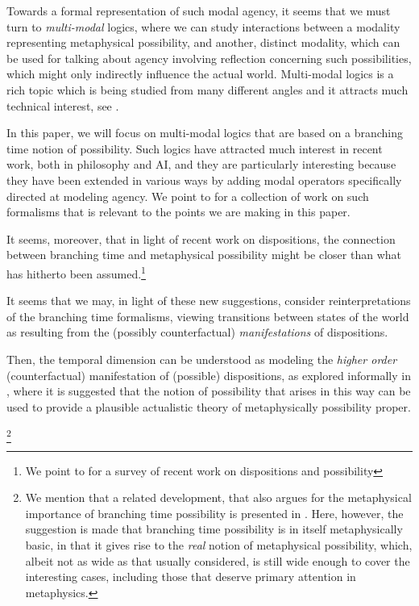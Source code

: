 \documentclass{article}
\begin{document}
Towards a formal representation of such modal agency, it seems that we must turn to \emph{multi-modal} logics, where we can study interactions between a modality representing metaphysical possibility, and another, distinct modality, which can be used for talking about agency involving reflection concerning such possibilities, which might only indirectly influence the actual world. Multi-modal logics is a rich topic which is being studied from many different angles and it attracts much technical interest, see \cite{multimod}.

In this paper, we will focus on multi-modal logics that are based on a branching time notion of possibility. Such logics have attracted much interest in recent work, both in philosophy and AI, and they are particularly interesting because they have been extended in various ways by adding modal operators specifically directed at modeling agency. We point to \cite{stit,dstit,atl,atle,nctl,stitstart} for a collection of work on such formalisms that is relevant to the points we are making in this paper.

It seems, moreover, that in light of recent work on dispositions, the connection between branching time and metaphysical possibility might be closer than what has hitherto been assumed.\footnote{We point to \cite{MwPw} for a survey of recent work on dispositions and possibility} 

It seems that we may, in light of these new suggestions, consider reinterpretations of the branching time formalisms, viewing transitions between states of the world as resulting from the (possibly counterfactual) \emph{manifestations} of dispositions. 

Then, the temporal dimension can be understood as modeling the \emph{higher order} (counterfactual) manifestation of (possible) dispositions, as explored informally in \cite{dispmod}, where it is suggested that the notion of possibility that arises in this way can be used to provide a plausible actualistic theory of metaphysically possibility proper.

\footnote{We mention that a related development, that also argues for the metaphysical importance of branching time possibility is presented in \cite{realmod}. Here, however, the suggestion is made that branching time possibility is in itself metaphysically basic, in that it gives rise to the \emph{real} notion of metaphysical possibility, which, albeit not as wide as that usually considered, is still wide enough to cover the interesting cases, including those that deserve primary attention in metaphysics.}
\end{document}
